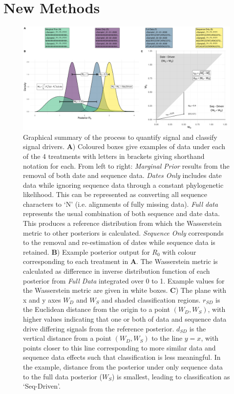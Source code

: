 \documentclass{article}
\begin{document}
\section*{New Methods}


\begin{figure}[H]
\centering
\includegraphics[width=1\linewidth]{figures/graphicalMethods.pdf}
\caption{Graphical summary of the process to quantify signal and classify signal drivers.  \textbf{A}) Coloured boxes give examples of data under each of the 4 treatments with letters in brackets giving shorthand notation for each. From left to right: \emph{Marginal Prior} results from the removal of both date and sequence data. \emph{Dates Only} includes date data while ignoring sequence data through a constant phylogenetic likelihood. This can be represented as converting all sequence characters to `N' (i.e. alignments of fully missing data). \emph{Full data} represents the usual combination of both sequence and date data. This produces a reference distribution from which the Wasserstein metric to other posteriors is calculated. \emph{Sequence Only} corresponds to the removal and re-estimation of dates while sequence data is retained. \textbf{B}) Example posterior output for $R_0$ with colour corresponding to each treatment in \textbf{A}. The Wasserstein metric is calculated as difference in inverse distribution function of each posterior from \emph{Full Data} integrated over 0 to 1. Example values for the Wasserstein metric are given in white boxes. \textbf{C}) The plane with x and y axes $W_D$ and $W_S$ and shaded classification regions. $r_{SD}$ is the Euclidean distance from the origin to a point $(W_D, W_S)$, with higher values indicating that one or both of data and sequence data drive differing signals from the reference posterior. $d_{SD}$ is the vertical distance from a point $(W_D, W_S)$ to the line $y=x$, with points closer to this line corresponding to more similar data and sequence data effects such that classification is less meaningful. In the example, distance from the posterior under only sequence data to the full data posterior ($W_S$) is smallest, leading to classification as `Seq-Driven'.}
\label{fig:method}
\end{figure}
\end{document}
